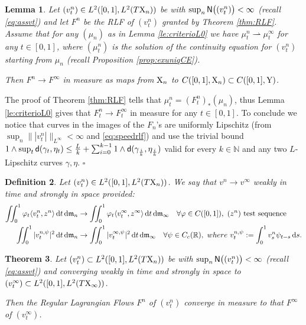 \documentclass[11pt]{article}
\numberwithin{equation}{section}
\newtheorem{theorem}{Theorem}[section]
\newtheorem{lemma}[theorem]{Lemma}
\newtheorem{definition}[theorem]{Definition}
\newenvironment{idea}{\removelastskip\par\medskip   %
\noindent{\em Idea of the proof} \rm}{\penalty-20\null\hfill$\square$\par\medbreak}
\newcommand{\N}{\mathbb{N}}
\newcommand{\R}{\mathbb{R}}
\newcommand{\X}{{\rm X}}
\newcommand{\Y}{{\rm Y}}
\newcommand{\sfd}{{\sf d}}
\newcommand{\mm}{{\mathfrak m}}
\renewcommand{\d}{{\rm d}}
\newcommand{\weakto}{\rightharpoonup}
\newcommand\la{\langle}
\newcommand\ra{\rangle}
\begin{document}
\begin{lemma}\label{le:2fl}
Let $(v^n_t)\in L^2([0,1],L^2(T\X_n))$ be with $\sup_{n}{\sf N}\big((v^n_t)\big)<\infty$ (recall \eqref{eq:assvt}) and let $F^n$ be the RLF of $(v^n_t)$ granted by Theorem \ref{thm:RLF}. Assume that for any $(\mu_n)$ as in Lemma \ref{le:criterioL0} we have $\mu_t^n\weakto \mu^\infty_t$ for any $t\in[0,1]$, where  $(\mu^n_t)$ is the solution of the continuity equation for $(v^n_t)$ starting from $\mu_n$ (recall Proposition \ref{prop:exuniqCE}). 

Then $F^n\to F^\infty$   in measure as maps from $\X_n$ to $C([0,1],\X_n)\subset C([0,1],\Y)$.
\end{lemma}
\begin{idea} The proof of Theorem \ref{thm:RLF} tells that $\mu^n_t=(F^n_t)_*(\mu_n)$, thus Lemma \ref{le:criterioL0} gives that $F^n_t\to F_t^\infty$ in measure for any $t\in[0,1]$. To conclude we notice that curves in the images of the $F_n$'s are uniformly Lipschitz (from $\sup_n\||v_t^n|\|_{L^\infty}<\infty$ and \eqref{eq:speedrlf}) and use the trivial bound $1\wedge\sup_t\sfd(\gamma_t,\eta_t)\leq \frac Lk+\sum_{i=0}^{k-1}1\wedge\sfd(\gamma_{\frac ik},\eta_{\frac ik})$ valid for every $k\in\N$ and any two $L$-Lipschitz curves $\gamma,\eta$. 
\end{idea}
\begin{definition} Let $(v^n_t)\in L^2([0,1],L^2(T\X_n))$. We say that $v^n\to v^\infty$ \emph{weakly in time and strongly in space} provided:
 \[
\begin{split}
\iint_0^1\varphi_t\la v^n_t, z^n\ra\,\d t\,\d\mm_n&\to\iint_0^1\varphi_t\la v^\infty_t, z^\infty\ra\,\d t\,\d\mm_\infty\quad\forall\varphi\in C([0,1]),\  (z^n)\ \text{\rm test sequence}\\
\iint_0^1|v^{n,\psi}_t|^2\,\d t\,\d\mm_n&\to \iint_0^1|v^{\infty,\psi}_t|^2\,\d t\,\d\mm_\infty\quad\forall \psi\in C_c(\R),\ where\ v^{n,\psi}_t:=\int_0^1v^n_s\psi_{t-s}\,\d s.
\end{split}
\]
\end{definition}
\begin{theorem}\label{thm:convflow}
Let $(v^n_t)\subset L^2([0,1],L^2(T\X_n))$ be with $\sup_{n}{\sf N}\big((v^n_t)\big)<\infty$ (recall \eqref{eq:assvt}) and converging weakly in time and strongly in space to $(v^\infty_t)\subset L^2([0,1],L^2(T\X_\infty))$. 

Then the Regular Lagrangian Flows  $F^n$ of $(v^n_t)$ converge in measure to that $F^\infty$ of $(v^\infty_t)$.
\end{theorem}
\end{document}
